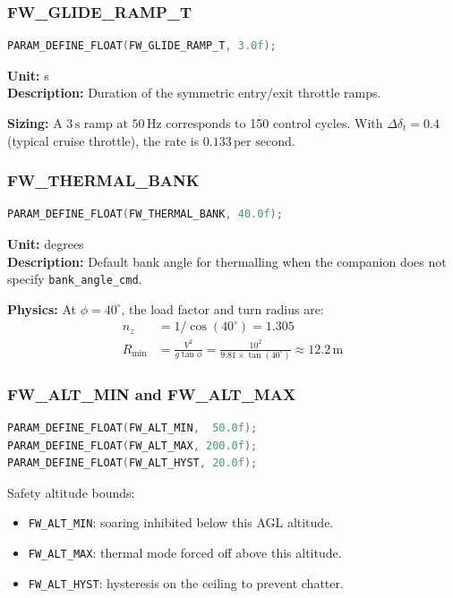 \documentclass[12pt,a4paper]{article}
\begin{document}
\subsubsection{FW\_GLIDE\_RAMP\_T}

\begin{lstlisting}[language=C]
PARAM_DEFINE_FLOAT(FW_GLIDE_RAMP_T, 3.0f);
\end{lstlisting}

\textbf{Unit:} s \\
\textbf{Description:} Duration of the symmetric entry/exit throttle ramps.

\textbf{Sizing:} A $3\,\text{s}$ ramp at $50\,\text{Hz}$ corresponds to
150 control cycles. With $\Delta\delta_t = 0.4$ (typical cruise throttle),
the rate is $0.133\,\text{per second}$.

\subsubsection{FW\_THERMAL\_BANK}

\begin{lstlisting}[language=C]
PARAM_DEFINE_FLOAT(FW_THERMAL_BANK, 40.0f);
\end{lstlisting}

\textbf{Unit:} degrees \\
\textbf{Description:} Default bank angle for thermalling when the companion
does not specify \texttt{bank\_angle\_cmd}.

\textbf{Physics:} At $\phi = 40^\circ$, the load factor and turn radius are:
\begin{align}
  n_z &= 1/\cos(40^\circ) = 1.305 \\
  R_{\min} &= \frac{V^2}{g\tan\phi}
            = \frac{10^2}{9.81 \times \tan(40^\circ)} \approx 12.2\,\text{m}
\end{align}

\subsubsection{FW\_ALT\_MIN and FW\_ALT\_MAX}

\begin{lstlisting}[language=C]
PARAM_DEFINE_FLOAT(FW_ALT_MIN,  50.0f);
PARAM_DEFINE_FLOAT(FW_ALT_MAX, 200.0f);
PARAM_DEFINE_FLOAT(FW_ALT_HYST, 20.0f);
\end{lstlisting}

Safety altitude bounds:
\begin{itemize}
  \item \texttt{FW\_ALT\_MIN}: soaring inhibited below this AGL altitude.
  \item \texttt{FW\_ALT\_MAX}: thermal mode forced off above this altitude.
  \item \texttt{FW\_ALT\_HYST}: hysteresis on the ceiling to prevent chatter.
\end{itemize}
\end{document}
